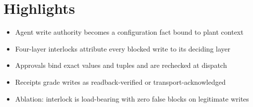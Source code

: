 \documentclass[a4paper,12pt]{article}
\begin{document}
\section*{Highlights}
\begin{itemize}
\item Agent write authority becomes a configuration fact bound to plant context
\item Four-layer interlocks attribute every blocked write to its deciding layer
\item Approvals bind exact values and tuples and are rechecked at dispatch
\item Receipts grade writes as readback-verified or transport-acknowledged
\item Ablation: interlock is load-bearing with zero false blocks on legitimate writes
\end{itemize}
\end{document}
